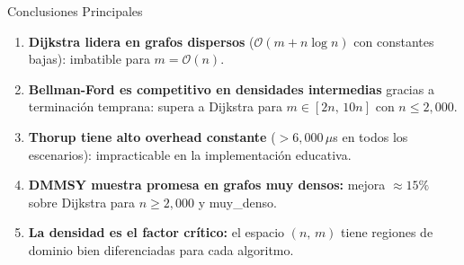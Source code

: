 \documentclass[aspectratio=169,12pt]{beamer}
\newcommand{\complejidad}[1]{\ensuremath{\mathcal{O}\!\left(#1\right)}}
\begin{document}
\begin{frame}{Conclusiones Principales}
  \begin{enumerate}
    \setlength\itemsep{0.45em}
    \item \textbf{Dijkstra lidera en grafos dispersos} (\complejidad{m+n\log n} con constantes bajas):
      imbatible para $m=\mathcal{O}(n)$.

    \item \textbf{Bellman-Ford es competitivo en densidades intermedias} gracias a
      terminación temprana: supera a Dijkstra para $m\in[2n,\,10n]$ con $n\leq2{,}000$.

    \item \textbf{Thorup tiene alto overhead constante} ($>6{,}000\,\mu$s en todos los
      escenarios): impracticable en la implementación educativa.

    \item \textbf{DMMSY muestra promesa en grafos muy densos:} mejora $\approx15\%$
      sobre Dijkstra para $n\geq2{,}000$ y muy\_denso.

    \item \textbf{La densidad es el factor crítico:} el espacio $(n,\,m)$ tiene regiones de dominio
      bien diferenciadas para cada algoritmo.
  \end{enumerate}
\end{frame}
\end{document}
